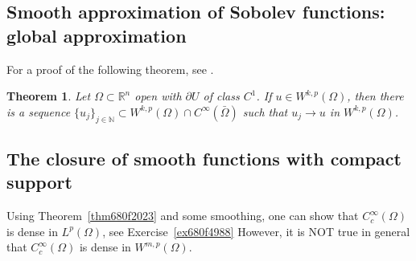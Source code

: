 \documentclass[a4paper,9pt]{amsart}
\newcommand{\scr}[1]{\mathscr{#1}}
\newcommand{\N}{\mathbb{N}}	%
\newcommand{\R}{\mathbb{R}}	%
\newcommand{\de}{\partial}		%
\newcommand{\spt}{\mathrm{spt}}
\newcommand{\TODO}{{\bf\color{Red}TODO}}
\theoremstyle{plain}
\newtheorem{theorem}[proposition]{Theorem}
\theoremstyle{definition}
\theoremstyle{remark}
\begin{document}
%	
%	
%	

\subsection{Smooth approximation of Sobolev functions: global approximation}

For a proof of the following theorem, see \cite[\S5.3.3]{MR2597943}.
\begin{theorem}
	Let $\Omega\subset\R^n$ open with $\de U$ of class $C^1$.
	If $u\in W^{k,p}(\Omega)$, then there is a sequence $\{u_j\}_{j\in\N}\subset W^{k,p}(\Omega)\cap C^\infty(\bar\Omega)$ such that $u_j\to u$ in $W^{k,p}(\Omega)$.
\end{theorem}

\subsection{The closure of smooth functions with compact support}
Using Theorem~\ref{thm680f2023} and some smoothing, one can show that $C^\infty_c(\Omega)$ is dense in $L^p(\Omega)$, see Exercise~\ref{ex680f4988}
However, it is NOT true in general that $C^\infty_c(\Omega)$ is dense in $W^{m,p}(\Omega)$.
 
\end{document}
